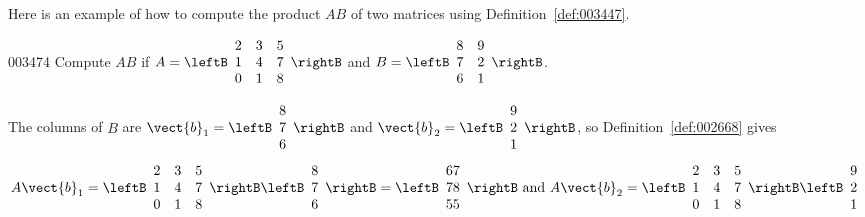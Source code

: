 \noindent Here is an example of how to compute the product $AB$ of two matrices using Definition~\ref{def:003447}.

\begin{example}{}{003474}
Compute $AB$ if $A = \leftB \begin{array}{rrr}
2 & 3 & 5 \\
1 & 4 & 7 \\
0 & 1 & 8
\end{array} \rightB$
 and
 $B = \leftB \begin{array}{rr}
 8 & 9 \\
 7 & 2 \\
 6 & 1
 \end{array} \rightB$.



\begin{solution}
  The columns of $B$ are 
  $\vect{b}_{1} = \leftB \begin{array}{r}
  8 \\
  7 \\
  6
  \end{array} \rightB$
 and $\vect{b}_{2} = \leftB \begin{array}{r}
 9 \\
 2 \\
 1
 \end{array} \rightB$, so Definition~\ref{def:002668} gives
\begin{equation*}
A\vect{b}_{1} = \leftB \begin{array}{rrr}
2 & 3 & 5 \\
1 & 4 & 7 \\
0 & 1 & 8
\end{array} \rightB \leftB \begin{array}{r}
8 \\
7 \\
6
\end{array} \rightB = \leftB \begin{array}{r}
67 \\
78 \\
55
\end{array} \rightB \mbox{ and } A\vect{b}_{2} = \leftB \begin{array}{rrr}
2 & 3 & 5 \\
1 & 4 & 7 \\
0 & 1 & 8
\end{array} \rightB \leftB \begin{array}{r}
9 \\
2 \\
1

\end{array}
\end{equation*}
\end{solution}
\end{example}
